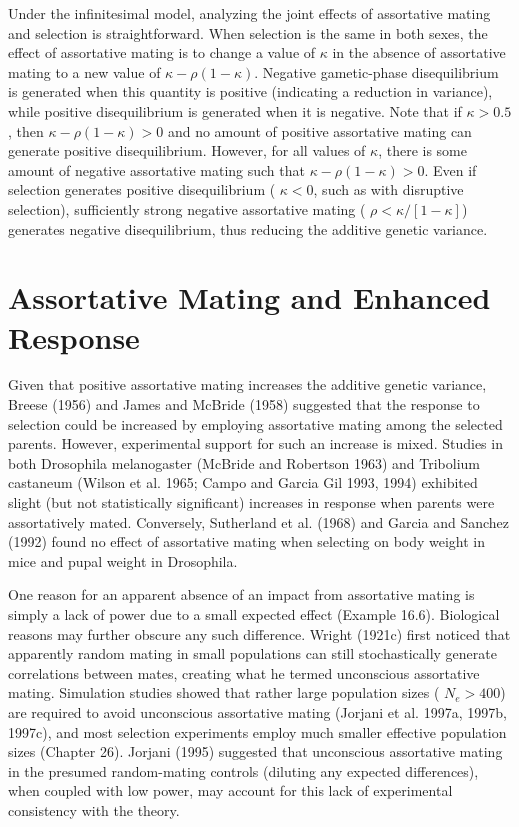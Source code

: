 \documentclass{article}
\begin{document}
Under the infinitesimal model, analyzing the joint effects of assortative mating and selection is straightforward. When selection is the same in both sexes, the effect of assortative mating is to change a value of  $ \kappa $ in the absence of assortative mating to a new value of  $ \kappa - \rho(1 - \kappa) $. Negative gametic-phase disequilibrium is generated when this quantity is positive (indicating a reduction in variance), while positive disequilibrium is generated when it is negative. Note that if  $ \kappa > 0.5 $, then  $ \kappa - \rho(1 - \kappa) > 0 $ and no amount of positive assortative mating can generate positive disequilibrium. However, for all values of  $ \kappa $, there is some amount of negative assortative mating such that  $ \kappa - \rho(1 - \kappa) > 0 $. Even if selection generates positive disequilibrium ( $ \kappa < 0 $, such as with disruptive selection), sufficiently strong negative assortative mating ( $ \rho < \kappa / [1 - \kappa] $) generates negative disequilibrium, thus reducing the additive genetic variance.

\section{Assortative Mating and Enhanced Response}
Given that positive assortative mating increases the additive genetic variance, Breese (1956) and James and McBride (1958) suggested that the response to selection could be increased by employing assortative mating among the selected parents. However, experimental support for such an increase is mixed. Studies in both Drosophila melanogaster (McBride and Robertson 1963) and Tribolium castaneum (Wilson et al. 1965; Campo and Garcia Gil 1993, 1994) exhibited slight (but not statistically significant) increases in response when parents were assortatively mated. Conversely, Sutherland et al. (1968) and Garcia and Sanchez (1992) found no effect of assortative mating when selecting on body weight in mice and pupal weight in Drosophila.

One reason for an apparent absence of an impact from assortative mating is simply a lack of power due to a small expected effect (Example 16.6). Biological reasons may further obscure any such difference. Wright (1921c) first noticed that apparently random mating in small populations can still stochastically generate correlations between mates, creating what he termed unconscious assortative mating. Simulation studies showed that rather large population sizes ( $ N_e > 400 $) are required to avoid unconscious assortative mating (Jorjani et al. 1997a, 1997b, 1997c), and most selection experiments employ much smaller effective population sizes (Chapter 26). Jorjani (1995) suggested that unconscious assortative mating in the presumed random-mating controls (diluting any expected differences), when coupled with low power, may account for this lack of experimental consistency with the theory.
\end{document}

